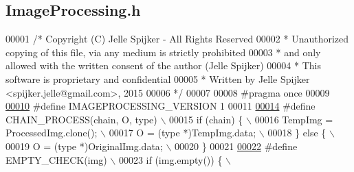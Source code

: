 \hypertarget{_image_processing_8h_source}{}\subsection{Image\+Processing.\+h}
\label{_image_processing_8h_source}

\begin{DoxyCode}
00001 \textcolor{comment}{/* Copyright (C) Jelle Spijker - All Rights Reserved}
00002 \textcolor{comment}{ * Unauthorized copying of this file, via any medium is strictly prohibited}
00003 \textcolor{comment}{ * and only allowed with the written consent of the author (Jelle Spijker)}
00004 \textcolor{comment}{ * This software is proprietary and confidential}
00005 \textcolor{comment}{ * Written by Jelle Spijker <spijker.jelle@gmail.com>, 2015}
00006 \textcolor{comment}{ */}
00007 
00008 \textcolor{preprocessor}{#pragma once}
00009 
\hypertarget{_image_processing_8h_source_l00010}{}\hyperlink{_image_processing_8h_a394287dd68e2ecc54ccb312685bc2fd0}{00010} \textcolor{preprocessor}{#define IMAGEPROCESSING\_VERSION 1}
00011 
\hypertarget{_image_processing_8h_source_l00014}{}\hyperlink{_image_processing_8h_a6e6f0183cb53c76ef458d4fd34e07bcd}{00014} \textcolor{preprocessor}{#define CHAIN\_PROCESS(chain, O, type)                                          \(\backslash\)}
00015 \textcolor{preprocessor}{  if (chain) \{                                                                 \(\backslash\)}
00016 \textcolor{preprocessor}{    TempImg = ProcessedImg.clone();                                            \(\backslash\)}
00017 \textcolor{preprocessor}{    O = (type *)TempImg.data;                                                  \(\backslash\)}
00018 \textcolor{preprocessor}{  \} else \{                                                                     \(\backslash\)}
00019 \textcolor{preprocessor}{    O = (type *)OriginalImg.data;                                              \(\backslash\)}
00020 \textcolor{preprocessor}{  \}}
00021 
\hypertarget{_image_processing_8h_source_l00022}{}\hyperlink{_image_processing_8h_a27c4e53b88a0f9f2c097add555131056}{00022} \textcolor{preprocessor}{#define EMPTY\_CHECK(img)                                                       \(\backslash\)}
00023 \textcolor{preprocessor}{  if (img.empty()) \{                                                           \(\backslash\)}

\end{DoxyCode}
